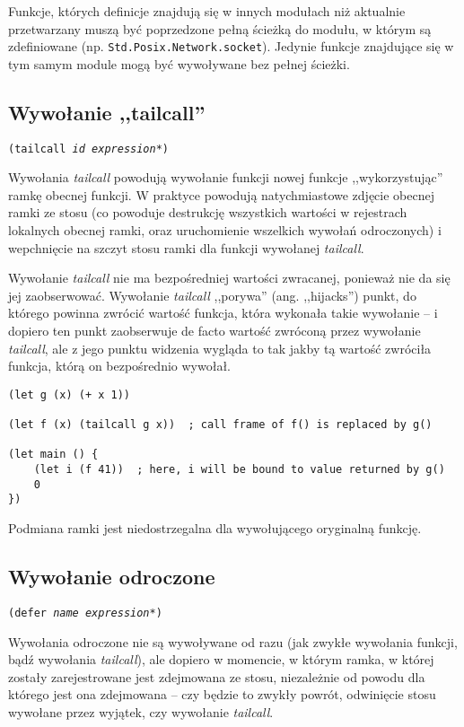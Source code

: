 Funkcje, których definicje znajdują się w innych modułach niż aktualnie przetwarzany muszą być poprzedzone
pełną ścieżką do modułu, w którym są zdefiniowane (np. \texttt{Std.Posix.Network.socket}). Jedynie funkcje
znajdujące się w tym samym module mogą być wywoływane bez pełnej ścieżki.

\subsection{Wywołanie ,,tailcall''}
\label{viuact_spec_tail_call}

\texttt{(tailcall \emph{id} \emph{expression}*)}
\newline

Wywołania \emph{tailcall} powodują wywołanie funkcji nowej funkcje ,,wykorzystując'' ramkę obecnej funkcji.
W praktyce powodują natychmiastowe zdjęcie obecnej ramki ze stosu (co powoduje destrukcję wszystkich wartości
w rejestrach lokalnych obecnej ramki, oraz uruchomienie wszelkich wywołań odroczonych) i wepchnięcie na szczyt
stosu ramki dla funkcji wywołanej \emph{tailcall}.

Wywołanie \emph{tailcall} nie ma bezpośredniej wartości zwracanej, ponieważ nie da się jej zaobserwować.
Wywołanie \emph{tailcall} ,,porywa'' (ang. ,,hijacks'') punkt, do którego powinna zwrócić wartość funkcja,
która wykonała takie wywołanie -- i dopiero ten punkt zaobserwuje de facto wartość zwróconą przez wywołanie
\emph{tailcall}, ale z jego punktu widzenia wygląda to tak jakby tą wartość zwróciła funkcja, którą on
bezpośrednio wywołał.

\begin{lstlisting}
(let g (x) (+ x 1))

(let f (x) (tailcall g x))  ; call frame of f() is replaced by g()

(let main () {
    (let i (f 41))  ; here, i will be bound to value returned by g()
    0
})
\end{lstlisting}

Podmiana ramki jest niedostrzegalna dla wywołującego oryginalną funkcję.

\subsection{Wywołanie odroczone}
\label{viuact_spec_deferred_call}

\texttt{(defer \emph{name} \emph{expression}*)}
\newline

Wywołania odroczone nie są wywoływane od razu (jak zwykłe wywołania funkcji, bądź wywołania \emph{tailcall}),
ale dopiero w momencie, w którym ramka, w której zostały zarejestrowane jest zdejmowana ze stosu, niezależnie
od powodu dla którego jest ona zdejmowana -- czy będzie to zwykły powrót, odwinięcie stosu wywołane przez
wyjątek, czy wywołanie \emph{tailcall}.

